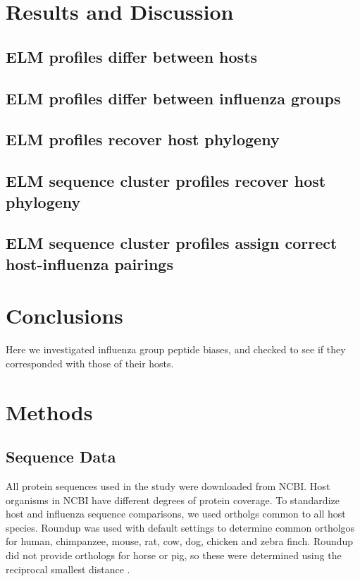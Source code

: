 \documentclass[10pt]{bmc_article}
\newenvironment{bmcformat}{\begin{raggedright}\baselineskip20pt\sloppy\setboolean{publ}{false}}{\end{raggedright}\baselineskip20pt\sloppy}
\begin{document}
\begin{bmcformat}
\section*{Results and Discussion}
  \subsection*{ELM profiles differ between hosts}

  \subsection*{ELM profiles differ between influenza groups}

  \subsection*{ELM profiles recover host phylogeny}

  \subsection*{ELM sequence cluster profiles recover host phylogeny}

  \subsection*{ELM sequence cluster profiles assign correct host-influenza pairings}

\section*{Conclusions}
Here we investigated influenza group peptide biases, and checked to
see if they corresponded with those of their hosts.
  
\section*{Methods}

\subsection*{Sequence Data}
All protein sequences used in the study were downloaded from
NCBI. Host organisms in NCBI have different degrees of protein
coverage. To standardize host and influenza sequence comparisons, we
used ortholgs common to all host species. Roundup
\cite{deluca2006roundup} was used with default settings to determine
common ortholgos for human, chimpanzee, mouse, rat, cow, dog, chicken
and zebra finch. Roundup did not provide orthologs for horse or pig,
so these were determined using the reciprocal smallest distance
\cite{wall2003detecting}.


\end{bmcformat}
\end{document}
